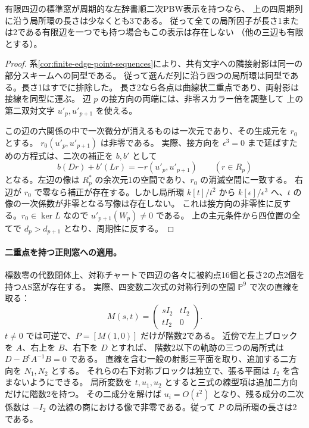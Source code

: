 \begin{corollary}\label{cor:pbw-no-double-cycle}
有限四辺の標準窓が周期的な左辞書順二次PBW表示を持つなら、
上の四周期列に沿う局所環の長さは少なくとも3である。
従って全ての局所因子が長さ1または2である有限辺を一つでも持つ場合もこの表示は存在しない
（他の三辺も有限とする）。
\end{corollary}
\begin{proof}
系\ref{cor:finite-edge-point-sequences}により、共有文字への隣接射影は同一の部分スキームへの同型である。
従って選んだ列に沿う四つの局所環は同型である。長さ1はすでに排除した。
長さ2なら各点は曲線状二重点であり、両射影は接線を同型に運ぶ。
辺 $p$ の接方向の両端には、非零スカラー倍を調整して
上の第二双対文字 $u'_p,u'_{p+1}$ を使える。

この辺の六関係の中で一次微分が消えるものは一次元であり、その生成元を $r_0$ とする。
$r_0(u'_p,u'_{p+1})$ は非零である。
実際、接方向を $\epsilon^3=0$ まで延ばすための方程式は、二次の補正を $b,b'$ として
\[
         b(D r)+b'(L r)=-r(u'_p,u'_{p+1})\qquad(r\in R_p)
\]
となる。左辺の像は $R_p^*$ の余次元1の空間であり、$r_0$ の消滅空間に一致する。
右辺が $r_0$ で零なら補正が存在する。しかし局所環 $k[t]/t^2$ から
$k[\epsilon]/\epsilon^3$ へ、$t$ の像の一次係数が非零となる写像は存在しない。
これは接方向の非零性に反する。$r_0\in\ker L$ なので $u'_{p+1}(W_p)\ne0$ である。
上の主元条件から四位置の全てで $d_p>d_{p+1}$ となり、周期性に反する。
\end{proof}

\paragraph{二重点を持つ正則窓への適用。}
標数零の代数閉体上、対称チャートで四辺の各々に被約点16個と長さ2の点2個を持つAS窓が存在する。
実際、四変数二次式の対称行列の空間 $\mathbb P^9$ で次の直線を取る：
\[
 M(s,t)=\begin{pmatrix}s I_2&t I_2\\ t I_2&0\end{pmatrix}.
\]
$t\ne0$ では可逆で、$P=[M(1,0)]$ だけが階数2である。
近傍で左上ブロックを $A$、右上を $B$、右下を $D$ とすれば、
階数2以下の軌跡の三つの局所式は $D-B^{\mathsf t}A^{-1}B=0$ である。
直線を含む一般の射影三平面を取り、追加する二方向を $N_1,N_2$ とする。
それらの右下対称ブロックは独立で、張る平面は $I_2$ を含まないようにできる。
局所変数を $t,u_1,u_2$ とすると三式の線型項は追加二方向だけに階数2を持つ。
その二成分を解けば $u_i=O(t^2)$ となり、残る成分の二次係数は
$-I_2$ の法線の商における像で非零である。従って $P$ の局所環の長さは2である。


